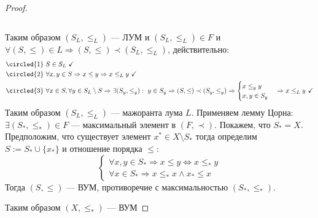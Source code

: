 \begin{proof}
\begin{itemize}
$$		$$
	\end{itemize}
Таким образом $(S_L, \leq_L)$ --- ЛУМ и $(S_L, \leq_L) \in F$ и $\forall (S, \leq) \in L \Rightarrow (S, \leq) \prec (S_L, \leq_L)$, действительно:
\begin{align*}
	&\circled{1} \ S \in S_L \ \checkmark \\
	&\circled{2} \ \forall x,y \in S \Rightarrow x \leq y \Rightarrow x \leq_L y \ \checkmark \\
	&\circled{3} \ \forall x \in S, \forall y \in S_L \setminus S  \Rightarrow \exists (S_y, \leq_y):	\ y \in S_y \Rightarrow (S, \leq) \prec (S_y, \leq_y) \Rightarrow \begin{cases}
		x \leq_y y \\
		x,y \in S_y
	\end{cases}
	\Rightarrow x \leq_L y \ \checkmark 
\end{align*} 
Таким образом $(S_L, \leq_L)$ --- мажоранта лума $L$. Применяем лемму Цорна: $\exists (S_*, \leq_*) \in F$ --- максимальный элемент в $(F, \prec)$. Покажем, что $S_* = X$. Предположим, что существует элемент 
$x^* \in X \setminus S_*$ тогда определим $S:= S_* \cup \{x_*\}$ и отношение порядка $\leq$:
$$
\begin{cases}
	\forall x,y \in S_* \Rightarrow x \leq y \Leftrightarrow x \leq_*y  \\
	\forall x \in S_* \Rightarrow x \leq_* x \wedge x_* \leq x
\end{cases}
$$
Тогда $(S, \leq)$ --- ВУМ, противоречие с максимальностью $(S_*, \leq_*)$.

 Таким образом $(X, \leq_*)$ --- ВУМ
\end{proof}


